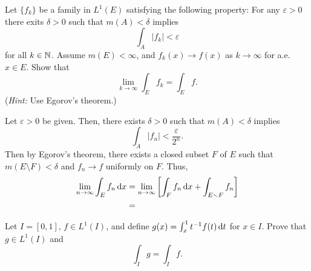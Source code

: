 \begin{problem}
  Let \(\{f_k\}\) be a family in \(L^1(E)\) satisfying the following
  property: For any \(\varepsilon>0\) there exits \(\delta>0\) such that
  \(m(A)<\delta\) implies
  \[
    \int_A |f_k|<\varepsilon
  \]
  for all \(k\in\mathbb{N}\). Assume \(m(E)<\infty\), and \(f_k(x)\to f(x)\) as
  \(k\to\infty\) for a.e.\@ \(x\in E\). Show that
  \[
    \lim_{k\to\infty}\int_E f_k=\int_E f.
  \]
  (\emph{Hint:} Use Egorov's theorem.)
\end{problem}
\begin{solution}
  Let \(\varepsilon>0\) be given. Then, there exists \(\delta>0\) such that
  \(m(A)<\delta\) implies
  \[
    \int_A|f_n|<\frac{\varepsilon}{2^n}.
  \]
  Then by Egorov's theorem, there exists a closed subset \(F\) of \(E\)
  such that \(m(E\setminus F)<\delta\) and \(f_n\to f\) uniformly on
  \(F\). Thus,
  \begin{align*}
    \lim_{n\to\infty}\int_E f_n\mathop{}\!\mathrm{d} x
    &=\lim_{n\to\infty}
      \left[\int_F f_n\mathop{}\!\mathrm{d} x
      +\int_{E\smallsetminus F}f_n\right]\\
    &=
  \end{align*}
\end{solution}

\begin{problem}
  Let \(I=[0,1]\), \(f\in L^1(I)\), and define
  \(g(x)=\int_x^1 t^{-1}f(t) \mathop{}\!\mathrm{d} t\) for \(x\in I\). Prove that
  \(g\in L^1(I)\) and
  \[
    \int_I g=\int_I f.
  \]
\end{problem}
\begin{solution}
\end{solution}


